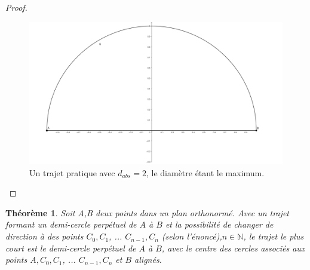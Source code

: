 \documentclass{amsart}
\newtheorem{theorem}{Théorème}[section]
\theoremstyle{definition}
\theoremstyle{remark}
\numberwithin{equation}{section}
\begin{document}
\begin{proof}
  \begin{figure}[H]
    \centering
    \includegraphics[scale=0.1]{images/ab_circle.png}
    \caption{Un trajet pratique avec $d_{abs}=2$, le diamètre étant le maximum.}
  \end{figure}

\end{proof}

\begin{theorem}
  Soit A,B deux points dans un plan orthonormé. Avec un trajet formant un demi-cercle perpétuel de $A$ à $B$ et la possibilité de changer de direction à des points $C_0, C_1$, ... $C_{n-1}, C_{n}$ (selon l'énoncé),$n\in\mathbb{N}$, le trajet le plus court
  est le demi-cercle perpétuel de $A$ à $B$, avec le centre des cercles associés aux points $A,C_0, C_1$, ... $C_{n-1}, C_{n}$ et $B$ alignés.
\end{theorem}
\end{document}
